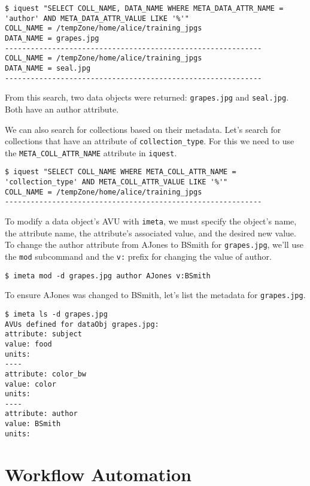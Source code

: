 \documentclass[10pt,oneside]{memoir}
\begin{document}
\begin{lstlisting}[basicstyle=\scriptsize\ttfamily]
$ iquest "SELECT COLL_NAME, DATA_NAME WHERE META_DATA_ATTR_NAME = 'author' AND META_DATA_ATTR_VALUE LIKE '%'"
COLL_NAME = /tempZone/home/alice/training_jpgs
DATA_NAME = grapes.jpg
------------------------------------------------------------
COLL_NAME = /tempZone/home/alice/training_jpgs
DATA_NAME = seal.jpg
------------------------------------------------------------
\end{lstlisting}

From this search, two data objects were returned: \texttt{grapes.jpg} and \texttt{seal.jpg}. Both have an author attribute.

We can also search for collections based on their metadata. Let's search for collections that have an attribute of \texttt{collection\_type}. For this we need to use the \texttt{META\_COLL\_ATTR\_NAME} attribute in \texttt{iquest}.

\begin{lstlisting}[basicstyle=\scriptsize\ttfamily]
$ iquest "SELECT COLL_NAME WHERE META_COLL_ATTR_NAME = 'collection_type' AND META_COLL_ATTR_VALUE LIKE '%'"
COLL_NAME = /tempZone/home/alice/training_jpgs
------------------------------------------------------------
\end{lstlisting}

To modify a data object's AVU with \texttt{imeta}, we must specify the object's name, the attribute name, the attribute's associated value, and the desired new value. To change the author attribute from AJones to BSmith for \texttt{grapes.jpg}, we'll use the \texttt{mod} subcommand and the \texttt{v:} prefix for changing the value of author.

\begin{lstlisting}
$ imeta mod -d grapes.jpg author AJones v:BSmith
\end{lstlisting}

To ensure AJones was changed to BSmith, let's list the metadata for \texttt{grapes.jpg}.

\begin{lstlisting}
$ imeta ls -d grapes.jpg
AVUs defined for dataObj grapes.jpg:
attribute: subject
value: food
units:
----
attribute: color_bw
value: color
units:
----
attribute: author
value: BSmith
units:
\end{lstlisting}

\chapter{Workflow Automation}
\end{document}
